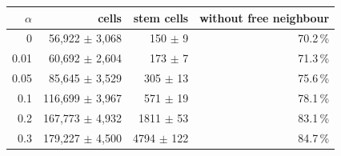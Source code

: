 \begin{tabular}{rrrr}
\toprule
$\alpha$ & cells & stem cells & without free neighbour \\
\midrule
0 & 56{,}922 $\pm$ 3{,}068 & 150 $\pm$ 9 & 70.2\,\% \\
0.01 & 60{,}692 $\pm$ 2{,}604 & 173 $\pm$ 7 & 71.3\,\% \\
0.05 & 85{,}645 $\pm$ 3{,}529 & 305 $\pm$ 13 & 75.6\,\% \\
0.1 & 116{,}699 $\pm$ 3{,}967 & 571 $\pm$ 19 & 78.1\,\% \\
0.2 & 167{,}773 $\pm$ 4{,}932 & 1811 $\pm$ 53 & 83.1\,\% \\
0.3 & 179{,}227 $\pm$ 4{,}500 & 4794 $\pm$ 122 & 84.7\,\% \\
\bottomrule
\end{tabular}
